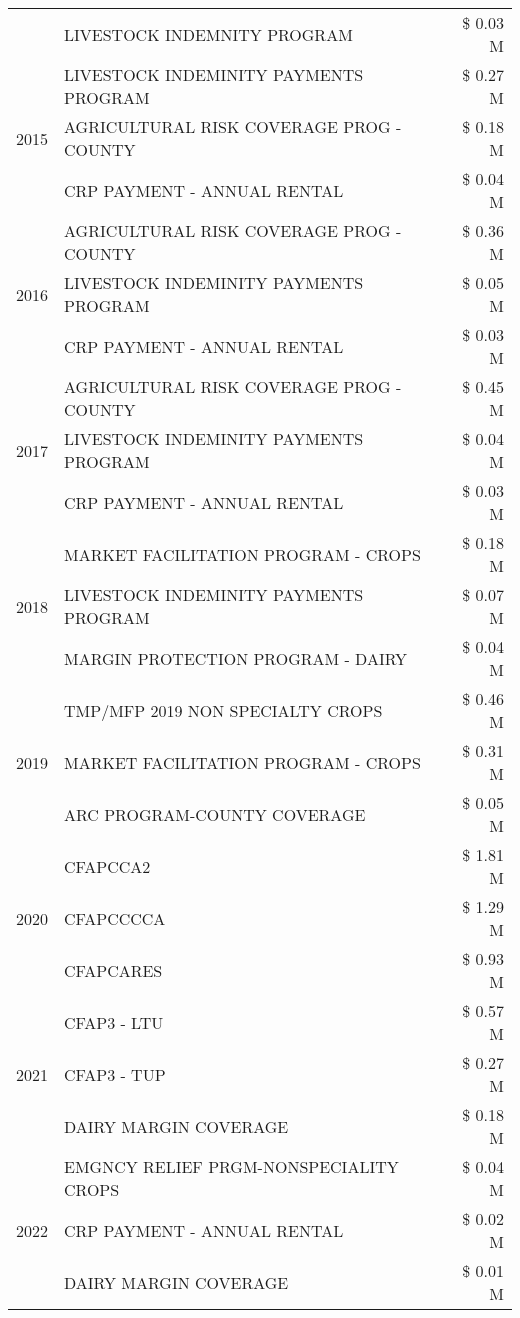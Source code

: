 \begin{tabular}{llr}
 & LIVESTOCK INDEMNITY PROGRAM & \$ 0.03 M \\
\cline{1-3}
\multirow[t]{3}{*}{2015} & LIVESTOCK INDEMINITY PAYMENTS PROGRAM & \$ 0.27 M \\
 & AGRICULTURAL RISK COVERAGE PROG - COUNTY & \$ 0.18 M \\
 & CRP PAYMENT - ANNUAL RENTAL & \$ 0.04 M \\
\cline{1-3}
\multirow[t]{3}{*}{2016} & AGRICULTURAL RISK COVERAGE PROG - COUNTY & \$ 0.36 M \\
 & LIVESTOCK INDEMINITY PAYMENTS PROGRAM & \$ 0.05 M \\
 & CRP PAYMENT - ANNUAL RENTAL & \$ 0.03 M \\
\cline{1-3}
\multirow[t]{3}{*}{2017} & AGRICULTURAL RISK COVERAGE PROG - COUNTY & \$ 0.45 M \\
 & LIVESTOCK INDEMINITY PAYMENTS PROGRAM & \$ 0.04 M \\
 & CRP PAYMENT - ANNUAL RENTAL & \$ 0.03 M \\
\cline{1-3}
\multirow[t]{3}{*}{2018} & MARKET FACILITATION PROGRAM - CROPS & \$ 0.18 M \\
 & LIVESTOCK INDEMINITY PAYMENTS PROGRAM & \$ 0.07 M \\
 & MARGIN PROTECTION PROGRAM - DAIRY & \$ 0.04 M \\
\cline{1-3}
\multirow[t]{3}{*}{2019} & TMP/MFP 2019 NON SPECIALTY CROPS & \$ 0.46 M \\
 & MARKET FACILITATION PROGRAM - CROPS & \$ 0.31 M \\
 & ARC PROGRAM-COUNTY COVERAGE & \$ 0.05 M \\
\cline{1-3}
\multirow[t]{3}{*}{2020} & CFAPCCA2 & \$ 1.81 M \\
 & CFAPCCCCA & \$ 1.29 M \\
 & CFAPCARES & \$ 0.93 M \\
\cline{1-3}
\multirow[t]{3}{*}{2021} & CFAP3 - LTU & \$ 0.57 M \\
 & CFAP3 - TUP & \$ 0.27 M \\
 & DAIRY MARGIN COVERAGE & \$ 0.18 M \\
\cline{1-3}
\multirow[t]{3}{*}{2022} & EMGNCY RELIEF PRGM-NONSPECIALITY CROPS & \$ 0.04 M \\
 & CRP PAYMENT - ANNUAL RENTAL & \$ 0.02 M \\
 & DAIRY MARGIN COVERAGE & \$ 0.01 M \\
\cline{1-3}
\bottomrule
\end{tabular}
